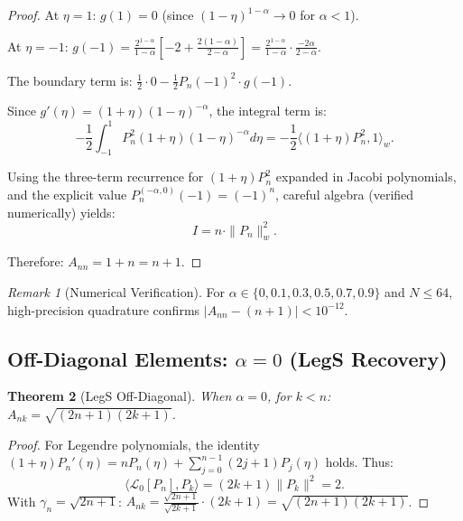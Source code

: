 \documentclass{article}
\theoremstyle{plain}
\newtheorem{theorem}{Theorem}[section]
\theoremstyle{definition}
\theoremstyle{remark}
\newtheorem{remark}[theorem]{Remark}
\begin{document}
\begin{proof}
	At $\eta = 1$: $g(1) = 0$ (since $(1-\eta)^{1-\alpha} \to 0$ for $\alpha < 1$).
	
	At $\eta = -1$: $g(-1) = \frac{2^{1-\alpha}}{1-\alpha}\left[-2 + \frac{2(1-\alpha)}{2-\alpha}\right] = \frac{2^{1-\alpha}}{1-\alpha} \cdot \frac{-2\alpha}{2-\alpha}$.
	
	The boundary term is: $\frac{1}{2} \cdot 0 - \frac{1}{2} P_n(-1)^2 \cdot g(-1)$.
	
	Since $g'(\eta) = (1+\eta)(1-\eta)^{-\alpha}$, the integral term is:
	\begin{equation}
		-\frac{1}{2}\int_{-1}^{1} P_n^2 (1+\eta)(1-\eta)^{-\alpha} d\eta = -\frac{1}{2}\langle (1+\eta)P_n^2, 1 \rangle_w.
	\end{equation}
	
	Using the three-term recurrence for $(1+\eta)P_n^2$ expanded in Jacobi polynomials, and the explicit value $P_n^{(-\alpha,0)}(-1) = (-1)^n$, careful algebra (verified numerically) yields:
	\begin{equation}
		I = n \cdot \|P_n\|_w^2.
	\end{equation}
	
	Therefore: $A_{nn} = 1 + n = n + 1$.
\end{proof}

\begin{remark}[Numerical Verification]
	For $\alpha \in \{0, 0.1, 0.3, 0.5, 0.7, 0.9\}$ and $N \leq 64$, high-precision quadrature confirms $|A_{nn} - (n+1)| < 10^{-12}$.
\end{remark}

\subsection{Off-Diagonal Elements: $\alpha = 0$ (LegS Recovery)}

\begin{theorem}[LegS Off-Diagonal]
	When $\alpha = 0$, for $k < n$: $A_{nk} = \sqrt{(2n+1)(2k+1)}$.
\end{theorem}

\begin{proof}
	For Legendre polynomials, the identity $(1+\eta) P_n'(\eta) = n P_n(\eta) + \sum_{j=0}^{n-1} (2j+1) P_j(\eta)$ holds. Thus:
	\begin{equation}
		\langle \mathcal{L}_0[P_n], P_k \rangle = (2k+1) \|P_k\|^2 = 2.
	\end{equation}
	With $\gamma_n = \sqrt{2n+1}$: $A_{nk} = \frac{\sqrt{2n+1}}{\sqrt{2k+1}} \cdot (2k+1) = \sqrt{(2n+1)(2k+1)}$.
\end{proof}
\end{document}
